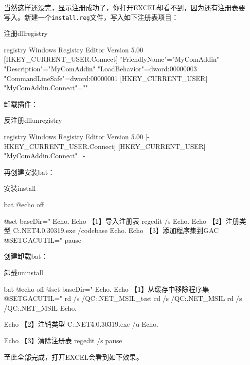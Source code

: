 \documentclass[math,code]{amznotes}
\begin{document}
	当然这样还没完，显示注册成功了，你打开EXCEL却看不到，因为还有注册表要写入。新建一个\verb|install.reg|文件，写入如下注册表项目\cite{CS_WPS}：
	\begin{codebox}{注册dll}{registry}
		\begin{amzcode}{registry}
	Windows Registry Editor Version 5.00
	[HKEY_CURRENT_USER\SOFTWARE\Microsoft\Office\EXCEL\Addins\MyComAddin.Connect]
	"FriendlyName"="MyComAddin"
	"Description"="MyComAddin"
	"LoadBehavior"=dword:00000003
	"CommandLineSafe"=dword:00000001
	[HKEY_CURRENT_USER\Software\Kingsoft\Office\ET\AddinsWL]
	"MyComAddin.Connect"=""
		\end{amzcode}
	\end{codebox}
	卸载插件：
	\begin{codebox}{反注册dll}{unregistry}
		\begin{amzcode}{registry}
			Windows Registry Editor Version 5.00
			[-HKEY_CURRENT_USER\SOFTWARE\Microsoft\Office\EXCEL\Addins\MyComAddin.Connect]
			[HKEY_CURRENT_USER\Software\Kingsoft\Office\ET\AddinsWL]
			"MyComAddin.Connect"=-
		\end{amzcode}
	\end{codebox}
	再创建安装bat：
	\begin{codebox}{安装}{install}
		\begin{amzcode}{bat}
	@echo off
	
	@set baseDir="%
	Echo.
	Echo 【1】导入注册表
	regedit /s %
	Echo.
	Echo 【2】注册类型
	C:\Windows\Microsoft.NET\v4.0.30319\RegAsm.exe /codebase %
	Echo.
	Echo 【3】添加程序集到GAC
	@SETGACUTIL="%
	pause
		\end{amzcode}
	\end{codebox}
	创建卸载bat：
	\begin{codebox}{卸载}{uninstall}
		\begin{amzcode}{bat}
			@echo off 
			@set baseDir="%
			Echo. 
			Echo 【1】从缓存中移除程序集 
			@SETGACUTIL="%
			rd /s /QC:\Windows\Microsoft.NET\assembly\GAC_MSIL\WPP_test 
			rd /s /QC:\Windows\Microsoft.NET\assembly\GAC_MSIL\PowerPoint 
			rd /s /QC:\Windows\Microsoft.NET\assembly\GAC_MSIL\Office 
			Echo.
			
			Echo 【2】注销类型 
			C:\Windows\Microsoft.NET\v4.0.30319\RegAsm.exe /u %
			Echo.
			
			Echo 【3】清除注册表 
			regedit /s %
			pause
		\end{amzcode}
	\end{codebox}
	至此全部完成，打开EXCEL会看到如下效果。 
\end{document}
